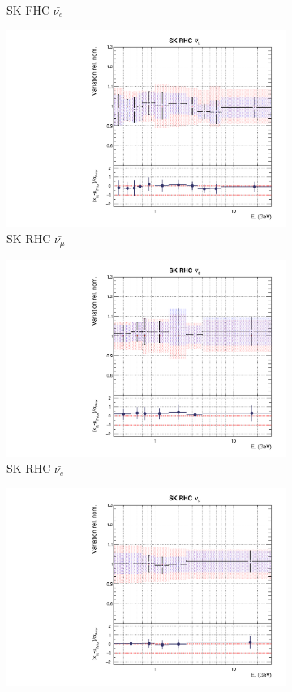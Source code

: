 \begin{figure}[t]
\begin{subfigure}{0.24\textwidth}
  \caption{SK FHC $\bar{\nu_e}$}
  \label{fig:}
\end{subfigure}
\begin{subfigure}{0.24\textwidth}
  \centering
  \includegraphics[width=0.95\linewidth]{figs/rhcmpdat248flux_12}
  \caption{SK RHC $\bar{\nu_{\mu}}$}
  \label{fig:}
\end{subfigure}
\begin{subfigure}{0.24\textwidth}
  \centering
  \includegraphics[width=0.95\linewidth]{figs/rhcmpdat248flux_13}
  \caption{SK RHC $\bar{\nu_e}$}
  \label{fig:}
\end{subfigure}
\begin{subfigure}{0.24\textwidth}
  \centering
  \includegraphics[width=0.95\linewidth]{figs/rhcmpdat248flux_14}

\end{subfigure}
\end{figure}
